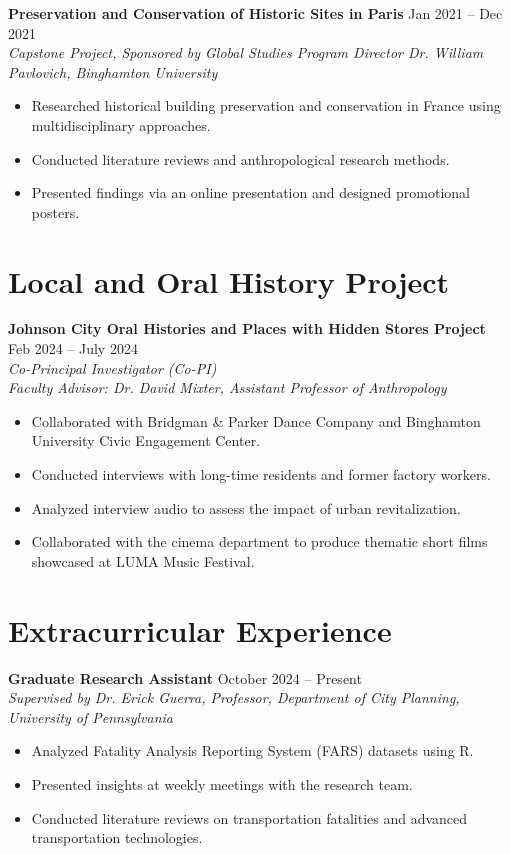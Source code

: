 \documentclass[11pt]{article}
\begin{document}
\noindent
\textbf{Preservation and Conservation of Historic Sites in Paris} \hfill Jan 2021 -- Dec 2021 \\
\textit{Capstone Project, Sponsored by Global Studies Program Director Dr. William Pavlovich, Binghamton University}
\begin{itemize}[leftmargin=*]
    \item Researched historical building preservation and conservation in France using multidisciplinary approaches.
    \item Conducted literature reviews and anthropological research methods.
    \item Presented findings via an online presentation and designed promotional posters.
\end{itemize}

\section*{Local and Oral History Project}
\noindent
\textbf{Johnson City Oral Histories and Places with Hidden Stores Project} \hfill Feb 2024 -- July 2024 \\
\textit{Co-Principal Investigator (Co-PI) \\
Faculty Advisor: Dr. David Mixter, Assistant Professor of Anthropology}
\begin{itemize}[leftmargin=*]
    \item Collaborated with Bridgman \& Parker Dance Company and Binghamton University Civic Engagement Center.
    \item Conducted interviews with long-time residents and former factory workers.
    \item Analyzed interview audio to assess the impact of urban revitalization.
    \item Collaborated with the cinema department to produce thematic short films showcased at LUMA Music Festival.
\end{itemize}

\section*{Extracurricular Experience}
\noindent
\textbf{Graduate Research Assistant} \hfill October 2024 -- Present \\
\textit{Supervised by Dr. Erick Guerra, Professor, Department of City Planning, University of Pennsylvania}
\begin{itemize}[leftmargin=*]
    \item Analyzed Fatality Analysis Reporting System (FARS) datasets using R.
    \item Presented insights at weekly meetings with the research team.
    \item Conducted literature reviews on transportation fatalities and advanced transportation technologies.
\end{itemize}
\end{document}
